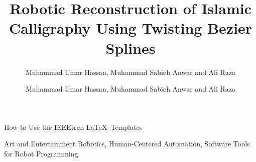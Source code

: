 \documentclass[lettersize,journal]{IEEEtran}
\begin{document}
\title{Robotic Reconstruction of Islamic Calligraphy Using Twisting Bezier Splines}
\author{Muhammad Umar Hassan, Muhammad Sabieh Anwar and Ali Raza
}

%
{How to Use the IEEEtran \LaTeX \ Templates}

\maketitle

\author{Muhammad Umar Hassan, Muhammad Sabieh Anwar and Ali Raza}
    
    \begin{IEEEkeywords}
    Art and Entertainment Robotics, Human-Centered Automation, Software Tools for Robot Programming
    \end{IEEEkeywords}
    
    
    
    
\end{document}
